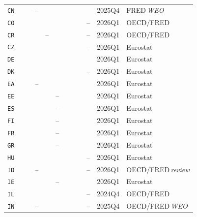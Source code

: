 \documentclass[11pt]{article}
\newcommand{\cmark}{{\color{green!55!black}\checkmark}}
\theoremstyle{definition}
\theoremstyle{remark}
\begin{document}
\begin{landscape}
{\begin{longtable}{@{}l ccccccccc l l@{}}
\texttt{CN} & \cmark & \cmark & -- & \cmark & \cmark & \cmark & \cmark & \cmark & \cmark & 2025Q4 & FRED\,\footnotesize\textit{WEO} \\
\texttt{CO} & \cmark & \cmark & \cmark & \cmark & \cmark & \cmark & \cmark & \cmark & -- & 2026Q1 & OECD/FRED \\
\texttt{CR} & \cmark & \cmark & \cmark & -- & \cmark & \cmark & \cmark & \cmark & -- & 2026Q1 & OECD/FRED \\
\texttt{CZ} & \cmark & \cmark & \cmark & \cmark & \cmark & \cmark & \cmark & \cmark & -- & 2026Q1 & Eurostat \\
\texttt{DE} & \cmark & \cmark & \cmark & \cmark & \cmark & \cmark & \cmark & \cmark & \cmark & 2026Q1 & Eurostat \\
\texttt{DK} & \cmark & \cmark & \cmark & \cmark & \cmark & \cmark & \cmark & \cmark & -- & 2026Q1 & Eurostat \\
\texttt{EA} & \cmark & \cmark & -- & \cmark & \cmark & \cmark & \cmark & \cmark & \cmark & 2026Q1 & Eurostat \\
\texttt{EE} & \cmark & \cmark & \cmark & \cmark & -- & \cmark & \cmark & \cmark & \cmark & 2026Q1 & Eurostat \\
\texttt{ES} & \cmark & \cmark & \cmark & \cmark & -- & \cmark & \cmark & \cmark & \cmark & 2026Q1 & Eurostat \\
\texttt{FI} & \cmark & \cmark & \cmark & \cmark & -- & \cmark & \cmark & \cmark & \cmark & 2026Q1 & Eurostat \\
\texttt{FR} & \cmark & \cmark & \cmark & \cmark & -- & \cmark & \cmark & \cmark & \cmark & 2026Q1 & Eurostat \\
\texttt{GR} & \cmark & \cmark & \cmark & \cmark & -- & \cmark & \cmark & \cmark & \cmark & 2026Q1 & Eurostat \\
\texttt{HU} & \cmark & \cmark & \cmark & \cmark & \cmark & \cmark & \cmark & \cmark & -- & 2026Q1 & Eurostat \\
\texttt{ID} & \cmark & \cmark & -- & \cmark & \cmark & \cmark & \cmark & \cmark & -- & 2026Q1 & OECD/FRED\,\footnotesize\textit{review} \\
\texttt{IE} & \cmark & \cmark & \cmark & \cmark & -- & \cmark & \cmark & \cmark & \cmark & 2026Q1 & Eurostat \\
\texttt{IL} & \cmark & \cmark & \cmark & \cmark & \cmark & \cmark & \cmark & \cmark & -- & 2024Q4 & OECD/FRED \\
\texttt{IN} & \cmark & \cmark & -- & \cmark & \cmark & \cmark & \cmark & \cmark & -- & 2025Q4 & OECD/FRED\,\footnotesize\textit{WEO} \\

\end{longtable}}
\end{landscape}
\end{document}
